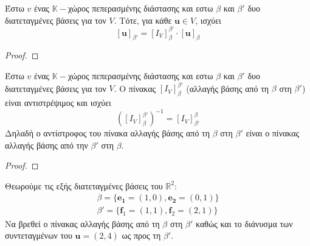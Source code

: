 \begin{thm}\label{thm:3}
  Έστω $v$ ένας $ \mathbb{K}- $χώρος πεπερασμένης διάστασης και εστω $\beta$ και 
  $\beta '$ δυο διατεταγμένες βάσεις για τον $V$. Τότε, για κάθε $ \mathbf{u} \in V $, 
  ισχύει 
  \[
    [\mathbf{u}]_{\beta '} = [I_{V}]_{\beta }^{\beta '} \cdot [\mathbf{u}]_{\beta }
  \] 
\end{thm}

\begin{proof}
\end{proof}

\begin{thm}\label{thm:4}
  Έστω $v$ ένας $ \mathbb{K}- $χώρος πεπερασμένης διάστασης και εστω $\beta$ και 
  $\beta '$ δυο διατεταγμένες βάσεις για τον $V$. Ο πίνακας $ [I_{V}]_{\beta }^{\beta '}
  $ (αλλαγής βάσης από τη $\beta$ στη $\beta '$) είναι αντιστρέψιμος και ισχύει 
  \[
    \left({[I_{V}]_{\beta }^{\beta '}}\right)^{-1} = [I_{V}]_{\beta '}^{\beta}  
  \] 
  Δηλαδή ο αντίστροφος του πίνακα αλλαγής βάσης από τη $\beta$ στη $\beta '$ είναι 
  ο πίνακας αλλαγής βάσης από την $\beta '$ στη $\beta$.
\end{thm}

\begin{proof}

\end{proof}

\begin{example}
  Θεωρούμε τις εξής διατεταγμένες βάσεις του $ \mathbb{R}^{2} $:
  \begin{align*}
    \beta = \{ \mathbf{e_{1}}= (1,0), \mathbf{e_{2}}= (0,1) \} \\
    \beta ' = \{ \mathbf{f}_{1} = (1,1), \mathbf{f} _{2} = (2,1) \} 
  \end{align*}
  Να βρεθεί ο πίνακας αλλαγής βάσης από τη $ \beta $ στη $ \beta' $ καθώς και το 
  διάνυσμα των συντεταγμένων του $ \mathbf{u} = (2,4) $ ως προς τη $\beta '$.
\end{example}

